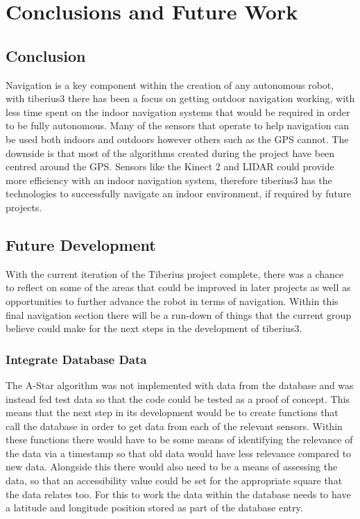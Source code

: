 \section{Conclusions and Future Work}

\subsection{Conclusion}
Navigation is a key component within the creation of any autonomous robot, with \gls{tiberius3} there has been a focus on getting outdoor navigation working, with less time spent on the indoor navigation systems that would be required in order to be fully autonomous.
\newline
Many of the sensors that operate to help navigation can be used both indoors and outdoors however others such as the \gls{GPS} cannot. The downside is that most of the algorithms created during the project have been centred around the \gls{GPS}. Sensors like the Kinect 2 and \gls{LIDAR} could provide more efficiency with an indoor navigation system, therefore \gls{tiberius3} has the technologies to successfully navigate an indoor environment, if required by future projects.
\subsection{Future Development}
With the current iteration of the Tiberius project complete, there was a chance to reflect on some of the areas that could be improved in later projects as well as opportunities to further advance the robot in terms of navigation. Within this final navigation section there will be a run-down of things that the current group believe could make for the next steps in the development of \gls{tiberius3}. 
\subsubsection{Integrate Database Data}
The A-Star algorithm was not implemented with data from the database and was instead fed test data so that the code could be tested as a proof of concept. This means that the next step in its development would be to create functions that call the database in order to get data from each of the relevant sensors. Within these functions there would have to be some means of identifying the relevance of the data via a timestamp so that old data would have less relevance compared to new data. Alongside this there would also need to be a means of assessing the data, so that an accessibility value could be set for the appropriate square that the data relates too. For this to work the data within the database needs to have a latitude and longitude position stored as part of the database entry.
